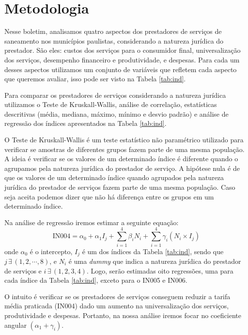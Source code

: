 
\section{Metodologia}\label{s:metod}


\begin{multicols}{2}
Nesse boletim, analisamos quatro aspectos dos prestadores de serviços de saneamento nos municípios paulistas, considerando a natureza jurídica do prestador. São eles: custos dos serviços para o consumidor final, universalização dos serviços, desempenho financeiro e produtividade, e despesas. Para cada um desses aspectos utilizamos um conjunto de variáveis que refletem cada aspecto que queremos avaliar, isso pode ser visto na Tabela \ref{tab:ind}.
\end{multicols}




\begin{multicols}{2}
Para comparar os prestadores de serviços considerando a natureza jurídica utilizamos o Teste de Kruskall-Wallis,  análise de correlação, estatísticas descritivas (média, mediana, máximo, mínimo e desvio padrão) e análise de regressão dos índices apresentados na Tabela \ref{tab:ind}.

O  Teste de Kruskall-Wallis é um teste estatístico não paramétrico utilizado para verificar se amostras de diferentes grupos fazem parte de uma mesma população.
A ideia é verificar se os valores de um determinado índice é diferente quando o agrupamos pela natureza jurídica do prestador de serviço. A hipótese nula é de que os valores de um determinado índice quando agrupados pela natureza jurídica do prestador de serviços fazem parte de uma mesma população. Caso seja aceita podemos dizer que não há diferença entre os grupos em um determinado índice.

Na análise de regressão iremos estimar a seguinte equação:
\begin{equation*}
	\text{IN004} = \alpha_0 +
	 \alpha_1 I_{j} +
	 \sum_{i=1}^{4} \beta_i N_i + 
	 \sum_{i=1}^{4} \gamma_i (N_i \times I_j)
\end{equation*}
onde $\alpha_0$ é o intercepto, $I_j$ é um dos índices da Tabela \ref{tab:ind}, sendo que $j \, \exists \, (1, 2, \cdots, 8)$, e $N_i$ é uma \textit{dummy} que indica a natureza jurídica do prestador de serviços e $i \, \exists \, (1, 2, 3, 4)$. Logo, serão estimadas oito regressões, uma para cada índice da Tabela \ref{tab:ind}, exceto para o IN005 e IN006. 

O intuito é verificar se os prestadores de serviços conseguem reduzir a tarifa média praticada (IN004) dado um aumento na universalização dos serviços, produtividade e despesas. Portanto, na nossa análise iremos focar no coeficiente angular $(\alpha_1 + \gamma_i)$. 

\end{multicols}












